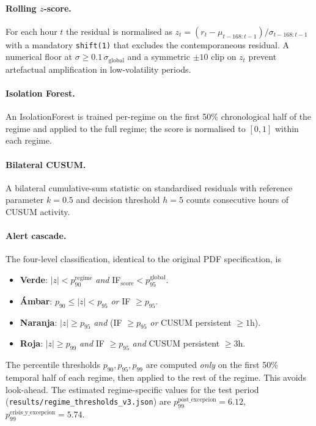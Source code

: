 \documentclass[11pt,a4paper]{article}
\begin{document}
\paragraph{Rolling $z$-score.} For each hour $t$ the residual is
normalised as
$z_t = (r_t - \mu_{t-168 : t-1}) / \sigma_{t-168 : t-1}$ with a
mandatory \texttt{shift(1)} that excludes the contemporaneous
residual. A numerical floor at $\sigma \geq 0.1\,\sigma_{\text{global}}$
and a symmetric $\pm 10$ clip on $z_t$ prevent artefactual
amplification in low-volatility periods.

\paragraph{Isolation Forest.} An IsolationForest is trained
per-regime on the first 50\% chronological half of the regime and
applied to the full regime; the score is normalised to $[0,1]$
within each regime.

\paragraph{Bilateral CUSUM.} A bilateral cumulative-sum statistic
on standardised residuals with reference parameter $k = 0.5$ and
decision threshold $h = 5$ counts consecutive hours of CUSUM
activity.

\paragraph{Alert cascade.} The four-level classification, identical
to the original PDF specification, is

\begin{itemize}
\item \textbf{Verde}: $|z| < p_{90}^{\text{regime}}$
\emph{and} IF$_{\text{score}} < p_{95}^{\text{global}}$.
\item \textbf{Ámbar}: $p_{90} \leq |z| < p_{95}$
\emph{or} IF $\geq p_{95}$.
\item \textbf{Naranja}: $|z| \geq p_{95}$
\emph{and} (IF $\geq p_{95}$ \emph{or} CUSUM persistent $\geq 1$h).
\item \textbf{Roja}: $|z| \geq p_{99}$ \emph{and}
IF $\geq p_{95}$ \emph{and} CUSUM persistent $\geq 3$h.
\end{itemize}

The percentile thresholds $p_{90}, p_{95}, p_{99}$ are computed
\emph{only} on the first 50\% temporal half of each regime, then
applied to the rest of the regime. This avoids look-ahead. The
estimated regime-specific values for the test period
(\texttt{results/regime\_thresholds\_v3.json}) are
$p_{99}^{\text{post\_excepcion}} = 6.12$,
$p_{99}^{\text{crisis\_y\_excepcion}} = 5.74$.
\end{document}
